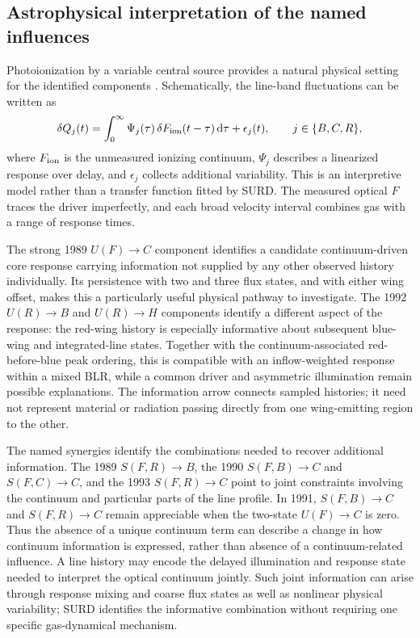 \documentclass[fleqn,usenatbib]{mnras}
\begin{document}
\subsection{Astrophysical interpretation of the named influences}
\label{sec:astrophysics}
Photoionization by a variable central source provides a natural physical setting for the identified components \citep{Peterson2004ApJ,Lu2022,Xi2025}. Schematically, the line-band fluctuations can be written as
\begin{equation}
\delta Q_j(t)=\int_0^\infty\Psi_j(\tau)\,
\delta F_{\rm ion}(t-\tau)\,{\rm d}\tau+\epsilon_j(t),
\qquad j\in\{B,C,R\},
\label{eq:ep_response_interpretation}
\end{equation}
where $F_{\rm ion}$ is the unmeasured ionizing continuum, $\Psi_j$ describes a linearized response over delay, and $\epsilon_j$ collects additional variability. This is an interpretive model rather than a transfer function fitted by SURD. The measured optical $F$ traces the driver imperfectly, and each broad velocity interval combines gas with a range of response times.

The strong 1989 $U(F)\to C$ component identifies a candidate continuum-driven core response carrying information not supplied by any other observed history individually. Its persistence with two and three flux states, and with either wing offset, makes this a particularly useful physical pathway to investigate. The 1992 $U(R)\to B$ and $U(R)\to H$ components identify a different aspect of the response: the red-wing history is especially informative about subsequent blue-wing and integrated-line states. Together with the continuum-associated red-before-blue peak ordering, this is compatible with an inflow-weighted response within a mixed BLR, while a common driver and asymmetric illumination remain possible explanations. The information arrow connects sampled histories; it need not represent material or radiation passing directly from one wing-emitting region to the other.

The named synergies identify the combinations needed to recover additional information. The 1989 $S(F,R)\to B$, the 1990 $S(F,B)\to C$ and $S(F,C)\to C$, and the 1993 $S(F,R)\to C$ point to joint constraints involving the continuum and particular parts of the line profile. In 1991, $S(F,B)\to C$ and $S(F,R)\to C$ remain appreciable when the two-state $U(F)\to C$ is zero. Thus the absence of a unique continuum term can describe a change in how continuum information is expressed, rather than absence of a continuum-related influence. A line history may encode the delayed illumination and response state needed to interpret the optical continuum jointly. Such joint information can arise through response mixing and coarse flux states as well as nonlinear physical variability; SURD identifies the informative combination without requiring one specific gas-dynamical mechanism.
\end{document}
